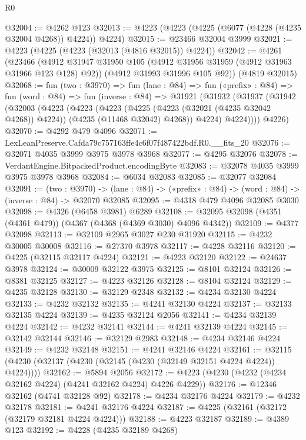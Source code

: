 \begin{lexlean}{R0}
\begin{coremodule}
@32004 := @4262 @123
@32013 := @4223 (@4223 (@4225 (@6077 (@4228 (@4235 @32004 @4268)) @4224)) @4224)
@32015 := @23466 @32004 @3999
@32021 := @4223 (@4225 (@4223 (@32013 (@4816 @32015)) @4224))
@32042 := @4261
    (@23466
      (@4912 @31947 @31950 @105 (@4912 @31956 @31959 (@4912 @31963 @31966 @123 @128) @92))
      (@4912 @31993 @31996 @105 @92))
    (@4819 @32015)
@32068 := fun (two : @3970) =>
  fun (lane : @84) =>
  fun («prefix» : @84) =>
  fun (word : @84) =>
  fun (inverse : @84) =>
  @31921
    (@31932
      (@31937
        (@31942
          (@32003
            (@4223
              (@4223
                (@4223
                  (@4225 (@4223 (@32021 (@4235 @32042 @4268)) @4224))
                  (@4235 (@11468 @32042) @4268))
                @4224)
              @4224))))
      @4226)
@32070 := @4292 @479 @4096
@32071 := LexLeanPreserve.Cafda79c757163ffe4c6f07f487422bdf.R0.__fits_20
@32076 := @32071 @4035 @3999 @3975 @3978 @3968
@32077 := @4295 @32076
@32078 := VerdantEngine.BitpackedProduct.encodingByte
@32083 := @32078 @4035 @3999 @3975 @3978 @3968
@32084 := @6034 @32083
@32085 := @32077 @32084
@32091 := (two : @3970) ->
  (lane : @84) -> («prefix» : @84) -> (word : @84) -> (inverse : @84) -> @32070 @32085
@32095 := @4318 @479 @4096 @32085 @3030
@32098 := @4326 (@6458 @3981) @6289
@32108 := @32095 @32098 (@4351 (@4361 @479)) (@4367 (@4368 (@4369 @3030) @4096 @4342))
@32109 := @4377 @32098
@32113 := @32109 @2965 @3027 @230 @31920
@32115 := @4232 @30005 @30008
@32116 := @27370 @3978
@32117 := @4228 @32116
@32120 := @4225 (@32115 @32117 @4224)
@32121 := @4223 @32120
@32122 := @24637 @3978
@32124 := @30009 @32122 @3975
@32125 := @8101 @32124
@32126 := @8381 @32125
@32127 := @4223 @32126
@32128 := @8104 @32124
@32129 := @4235 @32128
@32130 := @32129 @2348
@32132 := @4234 @32130 @4224
@32133 := @4232 @32132
@32135 := @4241 @32130 @4224
@32137 := @32133 @32135 @4224
@32139 := @4235 @32124 @2056
@32141 := @4234 @32139 @4224
@32142 := @4232 @32141
@32144 := @4241 @32139 @4224
@32145 := @32142 @32144
@32146 := @32129 @2983
@32148 := @4234 @32146 @4224
@32149 := @4232 @32148
@32151 := @4241 @32146 @4224
@32161 := @32115 (@4230 (@32137 (@4230 (@32145 (@4230 (@32149 @32151 @4224 @4224)) @4224))))
@32162 := @5894 @2056
@32172 := @4223 (@4230 (@4232 (@4234 @32162 @4224) (@4241 @32162 @4224) @4226 @4229))
@32176 := @12346 @32162 (@4741 @32128 @92)
@32178 := @4234 @32176 @4224
@32179 := @4232 @32178
@32181 := @4241 @32176 @4224
@32187 := @4225 (@32161 (@32172 (@32179 @32181 @4224 @4224)))
@32188 := @4223 @32187
@32189 := @4389 @123
@32192 := @4228 (@4235 @32189 @4268)

\end{coremodule}
\end{lexlean}

